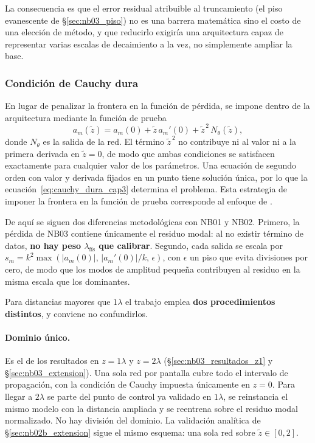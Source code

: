 La consecuencia es que el error residual atribuible al truncamiento
(el piso evanescente de §\ref{sec:nb03_piso}) no es una barrera
matemática sino el costo de una elección de método, y que reducirlo exigiría
una arquitectura capaz de representar varias escalas de decaimiento a la vez,
no simplemente ampliar la base.

\subsubsection*{Condición de Cauchy dura}

En lugar de penalizar la frontera en la función de pérdida, se impone dentro de
la arquitectura mediante la función de prueba
%
\begin{equation}
    a_m(\tilde z)=a_m(0)+\tilde z\,a_m'(0)+\tilde z^{\,2}\,N_\theta(\tilde z),
    \label{eq:cauchy_dura_cap3}
\end{equation}
%
donde $N_\theta$ es la salida de la red. El término $\tilde z^{\,2}$ no
contribuye ni al valor ni a la primera derivada en $\tilde z=0$, de modo que
ambas condiciones se satisfacen exactamente para cualquier valor de los
parámetros. Una ecuación de segundo orden con valor y derivada fijados en un
punto tiene solución única, por lo que la
ecuación~\eqref{eq:cauchy_dura_cap3} determina el problema. Esta estrategia de
imponer la frontera en la función de prueba corresponde al enfoque de
\textcite{sukumar2022exact}.

De aquí se siguen dos diferencias metodológicas con NB01 y NB02. Primero, la
pérdida de NB03 contiene únicamente el residuo modal: al no existir término de
datos, \textbf{no hay peso $\lambda_\text{fís}$ que calibrar}. Segundo, cada
salida se escala por
$s_m=k^2\max\!\left(|a_m(0)|,\,|a_m'(0)|/k,\,\epsilon\right)$, con $\epsilon$ un
piso que evita divisiones por cero, de modo que los modos de amplitud pequeña
contribuyen al residuo en la misma escala que los dominantes.

Para distancias mayores que $1\lambda$ el trabajo emplea \textbf{dos
procedimientos distintos}, y conviene no confundirlos.

\paragraph{Dominio único.} Es el de los resultados en $z=1\lambda$ y
$z=2\lambda$ (§\ref{sec:nb03_resultados_z1} y §\ref{sec:nb03_extension}). Una
sola red por pantalla cubre todo el intervalo de propagación, con la condición
de Cauchy impuesta únicamente en $z=0$. Para llegar a $2\lambda$ se parte del
punto de control ya validado en $1\lambda$, se reinstancia el mismo modelo con
la distancia ampliada y se reentrena sobre el residuo modal normalizado. No hay
división del dominio. La validación analítica de §\ref{sec:nb02b_extension}
sigue el mismo esquema: una sola red sobre $\tilde z\in[0,2]$.

